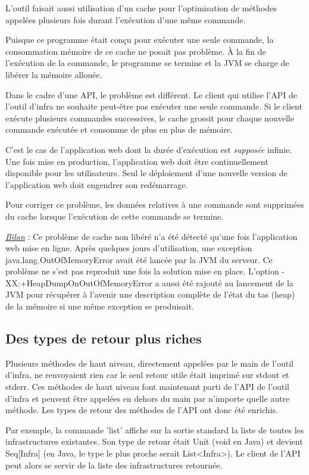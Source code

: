 L'outil faisait aussi utilisation d'un cache pour l'optimisation de méthodes
appelées plusieurs fois durant l'exécution d'une même commande.

Puisque ce programme était conçu pour exécuter une seule commande, la
consommation mémoire de ce cache ne posait pas problème.
À la fin de l'exécution de la commande, le programme se termine et la JVM
se charge de libérer la mémoire allouée.

Dans le cadre d'une API, le problème est différent. Le client qui utilise l'API
de l'outil d'infra ne souhaite peut-être pas exécuter une seule commande.
Si le client exécute plusieurs commandes successives, le cache grossit pour
chaque nouvelle commande exécutée et consomme de plus en plus de mémoire.

C'est le cas de l'application web dont la durée d'exécution est \textit{supposée}
infinie. Une fois mise en production, l'application web doit être
continuellement disponible pour les utilisateurs. Seul le déploiement d'une
nouvelle version de l'application web doit engendrer son redémarrage.

Pour corriger ce problème, les données relatives à une commande sont supprimées
du cache lorsque l'exécution de cette commande se termine.

\underline{\textit{Bilan}} : Ce problème de cache non libéré n'a été détecté
qu'une fois l'application web mise en ligne. Après quelques jours
d'utilisation, une exception java.lang.OutOfMemoryError avait été lancée par la
JVM du serveur. Ce problème ne s'est pas reproduit une fois la solution mise en
place. L'option -XX:+HeapDumpOnOutOfMemoryError a aussi été rajouté au lancement
de la JVM pour récupérer à l'avenir une description complète de l'état du tas
(heap) de la mémoire si une même exception se produisait.

\clearpage
\subsection{Des types de retour plus riches}

Plusieurs méthodes de haut niveau, directement appelées par le main de l'outil
d'infra, ne renvoyaient rien car le seul retour utile était imprimé
sur stdout et stderr. Ces méthodes de haut niveau font maintenant parti de l'API
de l'outil d'infra et peuvent être appelées en dehors du main par n'importe
quelle autre méthode.
Les types de retour des méthodes de l'API ont donc été enrichis.

Par exemple, la commande 'list' affiche sur la sortie standard la liste de
toutes les infrastructures existantes.
Son type de retour était Unit (void en Java) et devient Seq[Infra] (en Java, le
type le plus proche serait List<Infra>).
Le client de l'API peut alors se servir de la liste des infrastructures retournée.

